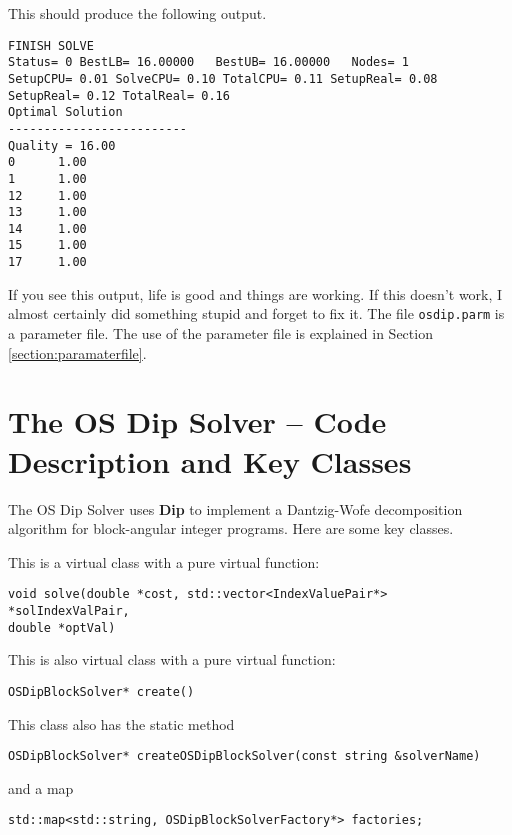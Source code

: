\documentclass[11pt]{article}
\begin{document}
This should produce the following output.


\begin{verbatim}
FINISH SOLVE
Status= 0 BestLB= 16.00000   BestUB= 16.00000   Nodes= 1      
SetupCPU= 0.01 SolveCPU= 0.10 TotalCPU= 0.11 SetupReal= 0.08 
SetupReal= 0.12 TotalReal= 0.16
Optimal Solution
-------------------------
Quality = 16.00
0      1.00
1      1.00
12     1.00
13     1.00
14     1.00
15     1.00
17     1.00

\end{verbatim}

If you see this output, life is good and things are working. If this doesn't
work, I almost certainly did something stupid and forget to fix it.  The file
{\tt osdip.parm} is a parameter file. The use of the parameter file is 
explained in Section \ref{section:paramaterfile}.


\section{The OS Dip Solver -- Code Description and
Key Classes}\label{section:osdipsolver}

The OS Dip Solver uses {\bf Dip} to implement a Dantzig-Wofe decomposition
algorithm for block-angular integer programs. Here are some key classes.




\vskip 8pt
  This is a virtual class with a pure virtual
function: 

\begin{verbatim}
void solve(double *cost, std::vector<IndexValuePair*> *solIndexValPair,
double *optVal)
\end{verbatim}



\vskip 8pt
  This is also virtual class with a pure
virtual function: 

\begin{verbatim}
OSDipBlockSolver* create()
\end{verbatim}

This class also has the static method

\begin{verbatim}
OSDipBlockSolver* createOSDipBlockSolver(const string &solverName)
\end{verbatim}

and a map

\begin{verbatim}
std::map<std::string, OSDipBlockSolverFactory*> factories;
\end{verbatim}
\end{document}
